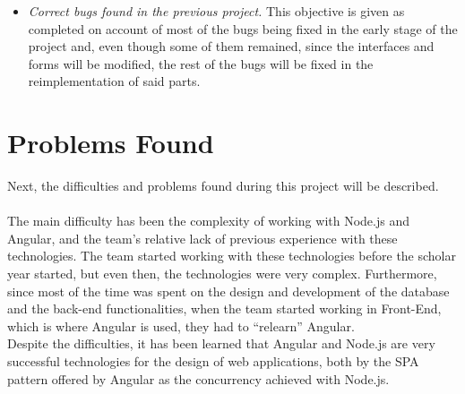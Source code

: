 \documentclass[11pt]{book}
\begin{document}
\begin{itemize}
		\item \emph{Correct bugs found in the previous project.}
		This objective is given as completed on account of most of the bugs being fixed in the early stage of the project and, even though some of them remained, since the interfaces and forms will be modified, the rest of the bugs will be fixed in the reimplementation of said parts.
	\end{itemize}
	
	\section{Problems Found}
	Next, the difficulties and problems found during this project will be described.\\\\
	The main difficulty has been the complexity of working with Node.js and Angular, and the team's relative lack of previous experience with these technologies. The team started working with these technologies before the scholar year started, but even then, the technologies were very complex. Furthermore, since most of the time was spent on the design and development of the database and the back-end functionalities, when the team started working in Front-End, which is where Angular is used, they had to ``relearn'' Angular.\\
	Despite the difficulties, it has been learned that Angular and Node.js are very successful technologies for the design of web applications, both by the SPA pattern offered by Angular as the concurrency achieved with Node.js.
	
\end{document}
